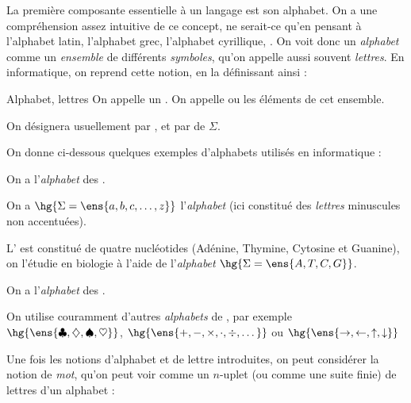     La première composante essentielle à un langage est son alphabet. On a une compréhension assez intuitive de ce concept, ne serait-ce qu'en
    pensant à l'alphabet latin, l'alphabet grec, l'alphabet cyrillique, \etc\!\!. On voit donc un \emph{alphabet} comme un \emph{ensemble} de différents \emph{symboles}, qu'on appelle aussi souvent \emph{lettres}. En
    informatique, on reprend cette notion, en la définissant ainsi :
        
    \begin{definition}{Alphabet, lettres}{}
        On appelle  un . On appelle  ou  les éléments de cet ensemble.
    \end{definition}
    \begin{notation}
        On désignera usuellement par , et par  de $\Sigma$.
    \end{notation}
    
    On donne ci-dessous quelques exemples d'alphabets utilisés en informatique :
    
    \begin{example}{}{}
        \begin{enumerate}
            \itt On a  l'\emph{alphabet} des .
            
            \itt On a $\hg{\Sigma = \ens{a, b, c, \dots, z}}$ l'\emph{alphabet}  (ici constitué des \textit{lettres} minuscules non
            accentuées).
            
            \itt L' est constitué de quatre nucléotides (Adénine, Thymine, Cytosine et Guanine), on l'étudie en biologie à l'aide de
            l'\emph{alphabet} $\hg{\Sigma = \ens{A, T, C, G}}$.
            
            \itt On a l'\emph{alphabet} des .
            
            \itt On utilise couramment d'autres \emph{alphabets} de , par exemple
            $\hg{\ens{\clubsuit,\diamondsuit,\spadesuit,\heartsuit}}$, $\hg{\ens{+, -, \times, \cdot, \div, \dots}}$ ou
            $\hg{\ens{\rightarrow,\leftarrow,\uparrow,\downarrow}}$
        \end{enumerate}
    \end{example}
    
    Une fois les notions d'alphabet et de lettre introduites, on peut considérer la notion de \emph{mot}, qu'on peut voir comme un $n$-uplet
    (ou comme une suite finie) de lettres d'un alphabet :
    
